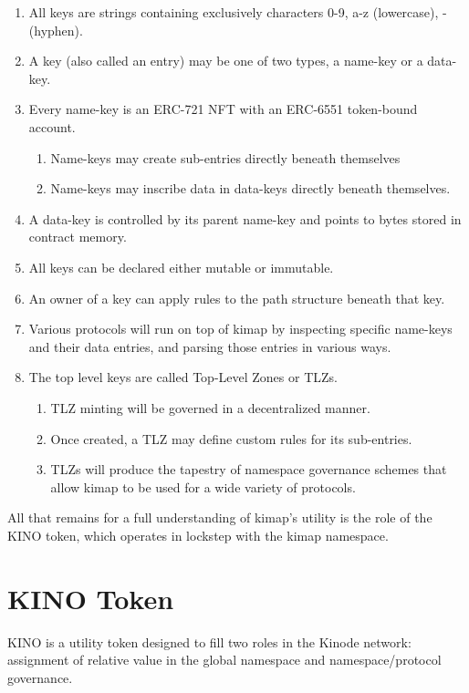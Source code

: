 \documentclass[runningheads]{llncs}
\begin{document}
\begin{enumerate}
    \item All keys are strings containing exclusively characters 0-9, a-z (lowercase), - (hyphen).
    \item A key (also called an entry) may be one of two types, a name-key or a data-key.
    \item Every name-key is an ERC-721 NFT with an ERC-6551 token-bound account.
        \begin{enumerate}
            \item Name-keys may create sub-entries directly beneath themselves
            \item Name-keys may inscribe data in data-keys directly beneath themselves.
        \end{enumerate}
    \item A data-key is controlled by its parent name-key and points to bytes stored in contract memory.
    \item All keys can be declared either mutable or immutable.
    \item An owner of a key can apply rules to the path structure beneath that key.
    \item Various protocols will run on top of kimap by inspecting specific name-keys and their data entries, and parsing those entries in various ways.
    \item The top level keys are called Top-Level Zones or TLZs.
        \begin{enumerate}
            \item TLZ minting will be governed in a decentralized manner.
            \item Once created, a TLZ may define custom rules for its sub-entries.
            \item TLZs will produce the tapestry of namespace governance schemes that allow kimap to be used for a wide variety of protocols.
        \end{enumerate}
\end{enumerate}

All that remains for a full understanding of kimap's utility is the role of the KINO token, which operates in lockstep with the kimap namespace.

\section{KINO Token}
\label{sec:kino}

KINO is a utility token designed to fill two roles in the Kinode network: assignment of relative value in the global namespace and namespace/protocol governance.
\end{document}
